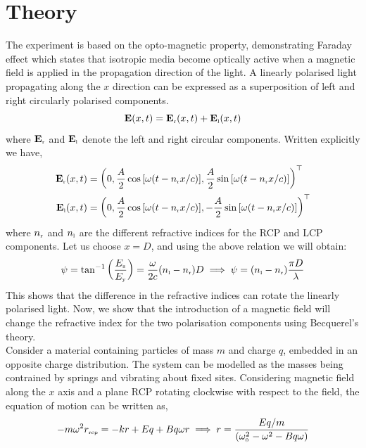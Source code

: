 \section{Theory}
The experiment is based on the opto-magnetic property, demonstrating Faraday effect which states that isotropic media become optically active when a magnetic field is applied in the propagation direction of the light. A linearly polarised light propagating along the $x$ direction can be expressed as a superposition of left and right circularly polarised components.
\begin{equation}
    \vb{E}(x,t) = \vb{E}_{\text{\tiny r}}(x,t) + \vb{E}_{\text{\tiny l}}(x,t)
\end{equation}
where $\vb{E}_{\text{\tiny r}}$ and $\vb{E}_{\text{\tiny l}}$ denote the left and right circular components. Written explicitly we have, 
\begin{align}
    \begin{split}
         \vb{E}_{\text{\tiny r}}(x,t) &= \qty(0, \frac{A}{2}\cos \qty[\omega\qty(t-n_{\text{\tiny r}}x/c)], \frac{A}{2}\sin \qty[\omega\qty(t-n_{\text{\tiny r}}x/c)])^\top\\
    \vb{E}_{\text{\tiny l}}(x,t) &= \qty(0, \frac{A}{2}\cos \qty[\omega\qty(t-n_{\text{\tiny r}}x/c)], -\frac{A}{2}\sin \qty[\omega\qty(t-n_{\text{\tiny r}}x/c)])^\top
    \end{split}
\end{align}
where $n_{\text{\tiny r}}$ and $n_{\text{\tiny l}}$ are the different refractive indices for the RCP and LCP components. Let us choose $x=D$, and using the above relation we will obtain: 
\begin{align}
    \psi= \tan^{-1}\qty(\frac{E_{\text{\tiny z}}}{E_{\text{\tiny y}}}) = \frac{\omega}{2c}(n_{\text{\tiny l}}-n_{\text{\tiny r}})D\implies \psi = (n_{\text{\tiny l}}-n_{\text{\tiny r}}) \frac{\pi D}{\lambda}
\end{align}
This shows that the difference in the refractive indices can rotate the linearly polarised light. Now, we show that the introduction of a magnetic field will change the refractive index for the two polarisation components using Becquerel's theory.\\[0.2cm] Consider a material containing particles of mass $m$ and charge $q$, embedded in an opposite charge distribution. The system can be modelled as the masses being contrained by springs and vibrating about fixed sites. Considering magnetic field along the $x$ axis and a plane RCP rotating clockwise with respect to the field, the equation of motion can be written as, 
\begin{equation}
    -m\omega^2 r_{\text{\tiny rcp}} = -kr + Eq +Bq\omega r \implies r = \frac{Eq/m}{(\omega_{\text{\tiny 0}}^2 - \omega^2-Bq\omega)}
\end{equation}
